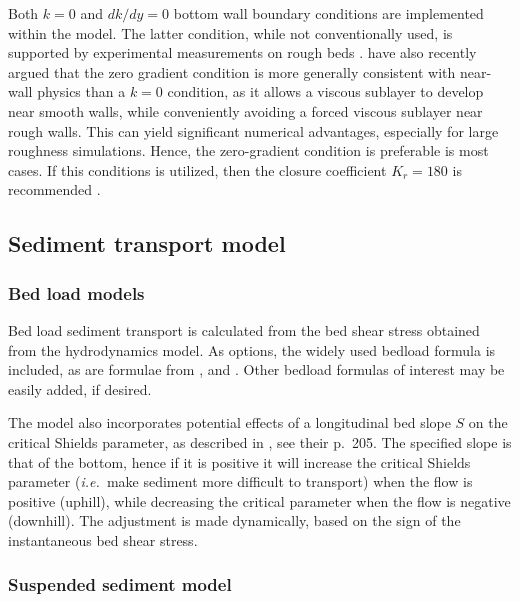 \documentclass[12pt]{article}
\newcommand{\ie}{{\it i.e.\ }}
\begin{document}
Both $k=0$ and $dk/dy=0$ bottom wall boundary conditions are
implemented within the model.  The latter condition, while not
conventionally used, is supported by experimental measurements on
rough beds \citep[][]{Sumeretal2003, Fuhrmanetal2010}.
\cite{Fuhrmanetal2010} have also recently argued that the zero
gradient condition is more generally consistent with near-wall physics
than a $k=0$ condition, as it allows a viscous sublayer to develop
near smooth walls, while conveniently avoiding a forced viscous
sublayer near rough walls.  This can yield significant numerical
advantages, especially for large roughness simulations.  Hence, the
zero-gradient condition is preferable is most cases.  If this
conditions is utilized, then the closure coefficient $K_r=180$ is
recommended \citep{Fuhrmanetal2010}.


\subsection{Sediment transport model}

\subsubsection{Bed load models}

Bed load sediment transport is calculated from the bed shear stress
obtained from the hydrodynamics model.  As options, the widely used
\cite{MeyerPeterMuller1948} bedload formula is included, as are
formulae from \cite{EngelundFredsoe1976}, and \cite{Nielsen1992}.
Other bedload formulas of interest may be easily added, if desired.

The model also incorporates potential effects of a longitudinal bed
slope $S$ on the critical Shields parameter, as described in
\cite{FredsoeDeigaard1992}, see their p.~205.  The specified slope is
that of the bottom, hence if it is positive it will increase the
critical Shields parameter (\ie make sediment more difficult to
transport) when the flow is positive (uphill), while decreasing the
critical parameter when the flow is negative (downhill).  The
adjustment is made dynamically, based on the sign of the instantaneous
bed shear stress.

\subsubsection{Suspended sediment model}
\end{document}
